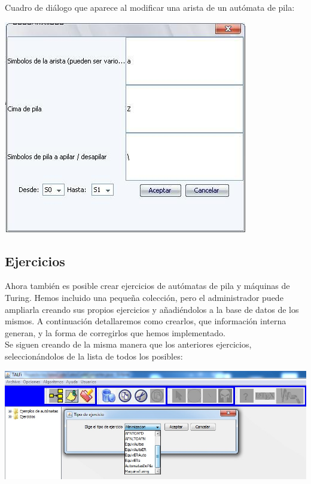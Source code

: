 \documentclass[12pt,a4paper,spanish]{book}
\begin{document}
\newpage
Cuadro de di\'{a}logo que aparece al modificar una arista de un aut\'omata de pila:\\
\begin{center}
\includegraphics[scale=0.6]{roci6.jpg}
\end{center}



\subsection{Ejercicios\\}
\label{sec:eje}
Ahora tambi\'en es posible crear ejercicios de aut\'omatas de pila y m\'aquinas de Turing. Hemos incluido una peque\~na colecci\'on, pero el administrador puede ampliarla creando sus propios ejercicios y a\~nadi\'endolos a la base de datos de los mismos. A continuaci\'on detallaremos como crearlos, que informaci\'on interna generan, y la forma de corregirlos que hemos implementado.\\
Se siguen creando de la misma manera que los anteriores ejercicios,\\ seleccion\'andolos de la lista de todos los posibles:
\begin{center}
\includegraphics[width=\textwidth]{ejer1.jpg}
\end{center}
\end{document}
